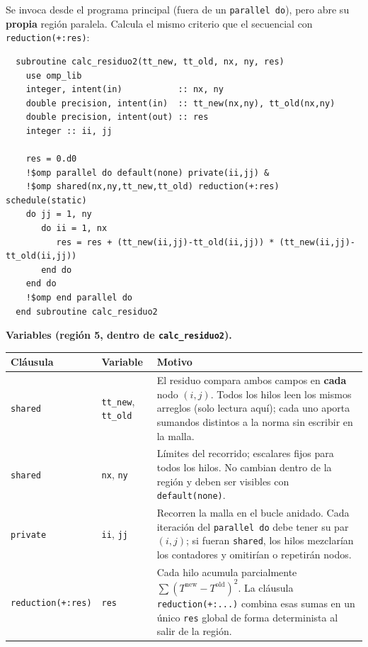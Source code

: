 \documentclass[11pt,a4paper]{article}
\begin{document}
Se invoca desde el programa principal (fuera de un \texttt{parallel do}), pero
abre su \textbf{propia} regi\'on paralela. Calcula el mismo criterio que el
secuencial con \texttt{reduction(+:res)}:

\begin{verbatim}
  subroutine calc_residuo2(tt_new, tt_old, nx, ny, res)
    use omp_lib
    integer, intent(in)           :: nx, ny
    double precision, intent(in)  :: tt_new(nx,ny), tt_old(nx,ny)
    double precision, intent(out) :: res
    integer :: ii, jj

    res = 0.d0
    !$omp parallel do default(none) private(ii,jj) &
    !$omp shared(nx,ny,tt_new,tt_old) reduction(+:res) schedule(static)
    do jj = 1, ny
       do ii = 1, nx
          res = res + (tt_new(ii,jj)-tt_old(ii,jj)) * (tt_new(ii,jj)-tt_old(ii,jj))
       end do
    end do
    !$omp end parallel do
  end subroutine calc_residuo2
\end{verbatim}

\noindent\textbf{Variables (regi\'on 5, dentro de \texttt{calc\_residuo2}).}
\begin{center}
\footnotesize
\begin{tabular}{@{}llM{7.6cm}@{}}
\hline
Cl\'ausula & Variable & Motivo \\
\hline
\texttt{shared} & \texttt{tt\_new}, \texttt{tt\_old} &
El residuo compara ambos campos en \textbf{cada} nodo $(i,j)$. Todos los hilos
leen los mismos arreglos (solo lectura aqu\'i); cada uno aporta sumandos distintos
a la norma sin escribir en la malla. \\
\texttt{shared} & \texttt{nx}, \texttt{ny} &
L\'imites del recorrido; escalares fijos para todos los hilos. No cambian dentro
de la regi\'on y deben ser visibles con \texttt{default(none)}. \\
\texttt{private} & \texttt{ii}, \texttt{jj} &
Recorren la malla en el bucle anidado. Cada iteraci\'on del \texttt{parallel do}
debe tener su par $(i,j)$; si fueran \texttt{shared}, los hilos mezclar\'ian los
contadores y omitir\'ian o repetir\'an nodos. \\
\texttt{reduction(+:res)} & \texttt{res} &
Cada hilo acumula parcialmente $\sum (T^{\mathrm{new}}-T^{\mathrm{old}})^2$.
La cl\'ausula \texttt{reduction(+:...)} combina esas sumas en un \'unico
\texttt{res} global de forma determinista al salir de la regi\'on. \\
\hline
\end{tabular}
\end{center}
\end{document}
